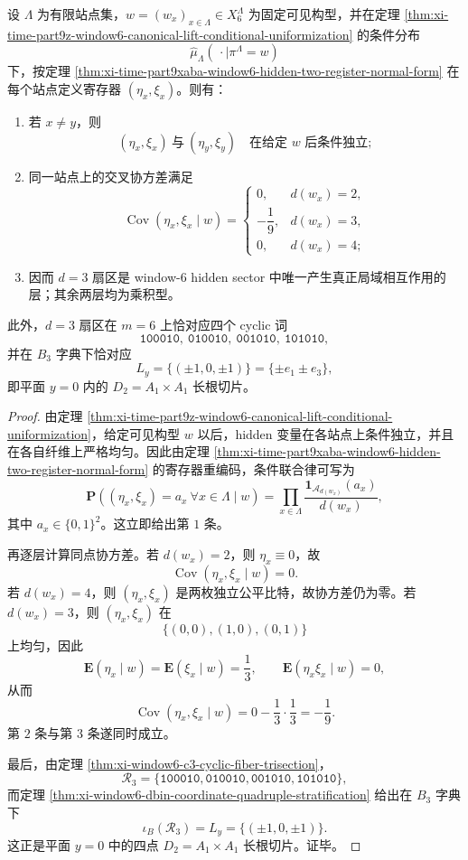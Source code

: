 \begin{proposition}\label{prop:xi-time-part9xaba-window6-d2-slice-unique-local-interaction}
设 \(\Lambda\) 为有限站点集，\(w=(w_x)_{x\in\Lambda}\in X_6^\Lambda\) 为固定可见构型，并在定理 \ref{thm:xi-time-part9z-window6-canonical-lift-conditional-uniformization} 的条件分布
\[
\widehat\mu_\Lambda(\,\cdot\mid \pi^\Lambda=w)
\]
下，按定理 \ref{thm:xi-time-part9xaba-window6-hidden-two-register-normal-form} 在每个站点定义寄存器 \((\eta_x,\xi_x)\)。则有：
\begin{enumerate}
  \item 若 \(x\neq y\)，则
  \[
  (\eta_x,\xi_x)\ \text{与}\ (\eta_y,\xi_y)
  \quad\text{在给定 }w\text{ 后条件独立};
  \]
  \item 同一站点上的交叉协方差满足
  \[
  \operatorname{Cov}(\eta_x,\xi_x\mid w)=
  \begin{cases}
  0,& d(w_x)=2,\\[4pt]
  -\dfrac19,& d(w_x)=3,\\[6pt]
  0,& d(w_x)=4;
  \end{cases}
  \]
  \item 因而 \(d=3\) 扇区是 window-\(6\) hidden sector 中唯一产生真正局域相互作用的层；其余两层均为乘积型。
\end{enumerate}
此外，\(d=3\) 扇区在 \(m=6\) 上恰对应四个 cyclic 词
\[
\texttt{100010},\ \texttt{010010},\ \texttt{001010},\ \texttt{101010},
\]
并在 \(B_3\) 字典下恰对应
\[
L_y=\{(\pm 1,0,\pm 1)\}=\{\pm e_1\pm e_3\},
\]
即平面 \(y=0\) 内的 \(D_2=A_1\times A_1\) 长根切片。
\end{proposition}
\begin{proof}
由定理 \ref{thm:xi-time-part9z-window6-canonical-lift-conditional-uniformization}，给定可见构型 \(w\) 以后，hidden 变量在各站点上条件独立，并且在各自纤维上严格均匀。因此由定理 \ref{thm:xi-time-part9xaba-window6-hidden-two-register-normal-form} 的寄存器重编码，条件联合律可写为
\[
\mathbf P\!\left((\eta_x,\xi_x)=a_x\ \forall x\in\Lambda\mid w\right)
=
\prod_{x\in\Lambda}
\frac{\mathbf 1_{\mathcal A_{d(w_x)}}(a_x)}{d(w_x)},
\]
其中 \(a_x\in\{0,1\}^2\)。这立即给出第 \(1\) 条。

再逐层计算同点协方差。若 \(d(w_x)=2\)，则 \(\eta_x\equiv 0\)，故
\[
\operatorname{Cov}(\eta_x,\xi_x\mid w)=0.
\]
若 \(d(w_x)=4\)，则 \((\eta_x,\xi_x)\) 是两枚独立公平比特，故协方差仍为零。若 \(d(w_x)=3\)，则 \((\eta_x,\xi_x)\) 在
\[
\{(0,0),(1,0),(0,1)\}
\]
上均匀，因此
\[
\mathbf E(\eta_x\mid w)=\mathbf E(\xi_x\mid w)=\frac13,
\qquad
\mathbf E(\eta_x\xi_x\mid w)=0,
\]
从而
\[
\operatorname{Cov}(\eta_x,\xi_x\mid w)
=
0-\frac13\cdot\frac13
=
-\frac19.
\]
第 \(2\) 条与第 \(3\) 条遂同时成立。

最后，由定理 \ref{thm:xi-window6-c3-cyclic-fiber-trisection}，
\[
\mathcal R_3=\{\texttt{100010},\texttt{010010},\texttt{001010},\texttt{101010}\},
\]
而定理 \ref{thm:xi-window6-dbin-coordinate-quadruple-stratification} 给出在 \(B_3\) 字典下
\[
\iota_B(\mathcal R_3)=L_y=\{(\pm 1,0,\pm 1)\}.
\]
这正是平面 \(y=0\) 中的四点 \(D_2=A_1\times A_1\) 长根切片。证毕。
\end{proof}

